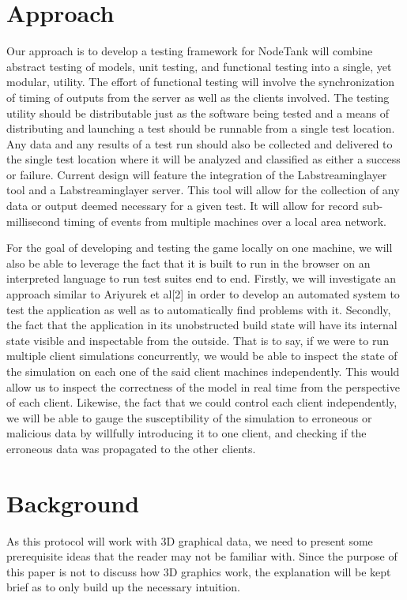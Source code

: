 \documentclass[conference]{IEEEtran}
\begin{document}
\section{Approach}
Our approach is to develop a testing framework for NodeTank will combine abstract testing of models, unit testing, and functional testing into a single, yet modular,
utility. The effort of functional testing will involve the synchronization of timing of outputs from the server as well as the clients involved. The testing utility
should be distributable just as the software being tested and a means of distributing and launching a test should be runnable from a single test location. Any data and
any results of a test run should also be collected and delivered to the single test location where it will be analyzed and classified as either a success or failure.
Current design will feature the integration of the Labstreaminglayer tool and a Labstreaminglayer server. This tool will allow for the collection of any data or output
deemed necessary for a given test. It will allow for record sub-millisecond timing of events from multiple machines over a local area network.

For the goal of developing and testing the game locally on one machine, we will also be able to leverage the fact that it is built to run in the browser on
an interpreted language to run test suites end to end. Firstly, we will investigate an approach similar to Ariyurek et al[2] in order to develop an automated
system to test the application as well as to automatically find problems with it. Secondly, the fact that the application in its unobstructed build state will have
its internal state visible and inspectable from the outside. That is to say, if we were to run multiple client simulations concurrently, we would be able to inspect
the state of the simulation on each one of the said client machines independently. This would allow us to inspect the correctness of the model in real time from the
perspective of each client. Likewise, the fact that we could control each client independently, we will be able to gauge the susceptibility of the simulation to erroneous
or malicious data by willfully introducing it to one client, and checking if the erroneous data was propagated to the other clients.

\section{Background}

As this protocol will work with 3D graphical data, we need to present some prerequisite ideas that the reader may not be
familiar with. Since the purpose of this paper is not to discuss how 3D graphics work, the explanation will be kept brief
as to only build up the necessary intuition.
\end{document}
